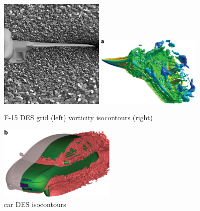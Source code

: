 \documentclass[journal]{new-aiaa}
\begin{document}
\begin{figure}[H]
\begin{center}
\includegraphics[width=0.45\textwidth]{Images/logan/forsythe2004detachededdy_f15grid.pdf}
\includegraphics[width=0.45\textwidth]{Images/logan/spalart2009detachededdy_f15des.pdf}
\caption{ F-15 DES grid (left) \cite{forsythe2004detachededdy} vorticity isocontours (right) \cite{spalart2009detachededdy} }
\label{fig:f15des}
\end{center}
\end{figure}



\begin{figure}[H]
\begin{center}
\includegraphics[width=0.5\textwidth]{Images/logan/spalart2009detachededdy_carDES.pdf}
\caption{ car DES isocontours \cite{mendonca2002towards} }
\label{fig:cardes}
\end{center}
\end{figure}
\end{document}
